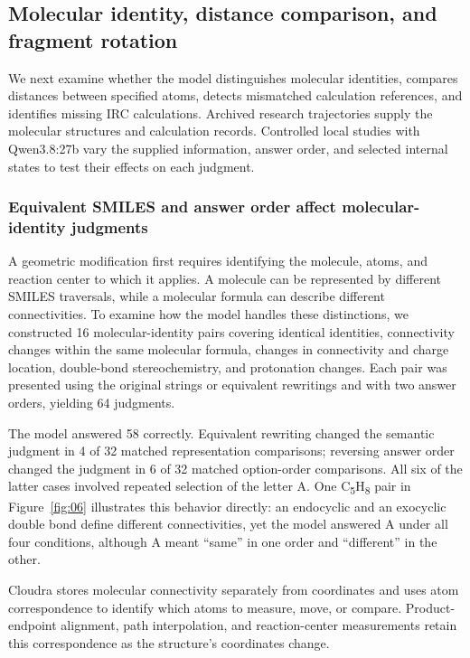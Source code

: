 

\subsection{Molecular identity, distance comparison, and fragment rotation}

We next examine whether the model distinguishes molecular identities, compares distances between specified atoms, detects mismatched calculation references, and identifies missing IRC calculations. Archived research trajectories supply the molecular structures and calculation records. Controlled local studies with Qwen3.8:27b vary the supplied information, answer order, and selected internal states to test their effects on each judgment.

\subsubsection{Equivalent SMILES and answer order affect molecular-identity judgments}
\label{sec:identity-judgments}

A geometric modification first requires identifying the molecule, atoms, and reaction center to which it applies. A molecule can be represented by different SMILES traversals, while a molecular formula can describe different connectivities. To examine how the model handles these distinctions, we constructed 16 molecular-identity pairs covering identical identities, connectivity changes within the same molecular formula, changes in connectivity and charge location, double-bond stereochemistry, and protonation changes. Each pair was presented using the original strings or equivalent rewritings and with two answer orders, yielding 64 judgments.

The model answered 58 correctly. Equivalent rewriting changed the semantic judgment in 4 of 32 matched representation comparisons; reversing answer order changed the judgment in 6 of 32 matched option-order comparisons. All six of the latter cases involved repeated selection of the letter A. One C\textsubscript{5}H\textsubscript{8} pair in Figure~\ref{fig:06} illustrates this behavior directly: an endocyclic and an exocyclic double bond define different connectivities, yet the model answered A under all four conditions, although A meant “same” in one order and “different” in the other.

Cloudra stores molecular connectivity separately from coordinates and uses atom correspondence to identify which atoms to measure, move, or compare. Product-endpoint alignment, path interpolation, and reaction-center measurements retain this correspondence as the structure's coordinates change.

